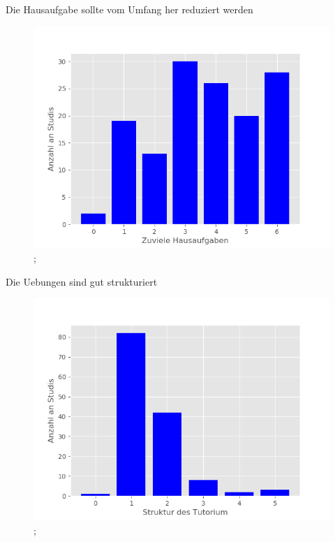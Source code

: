\documentclass[10pt]{beamer}
\begin{document}
\begin{frame}[fragile]{Die Hausaufgabe sollte vom Umfang her reduziert werden} 
 \begin{figure}
 \includegraphics[width= 0.9\linewidth]{./PDFcreater/Plots/Die+Hausaufgabe+sollte+vom+Umfang+her+reduziert+werden.png};
 \end{figure}
 \end{frame}
\begin{frame}[fragile]{Die Uebungen sind gut strukturiert} 
 \begin{figure}
 \includegraphics[width= 0.9\linewidth]{./PDFcreater/Plots/Die+Uebungen+sind+gut+strukturiert.png};
 \end{figure}
 \end{frame}
\end{document}
